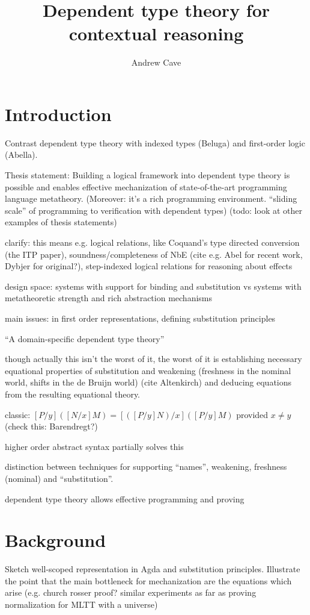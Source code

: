 \documentclass{article}
\author{Andrew Cave}
\title{Dependent type theory for contextual reasoning}
\begin{document}
\maketitle

\section{Introduction}
Contrast dependent type theory with indexed types (Beluga) and first-order
logic (Abella). 

Thesis statement: Building a logical framework into dependent type
theory is possible and enables effective mechanization of state-of-the-art programming
language metatheory. (Moreover: it's a rich programming
environment. ``sliding scale'' of programming to verification with dependent types)
(todo: look at other examples of thesis statements)

clarify: this means e.g. logical relations, like Coquand's type
directed conversion (the ITP paper), soundness/completeness of NbE
(cite e.g. Abel for recent work, Dybjer for original?),
step-indexed logical relations for reasoning about effects

design space: systems with support for binding and substitution vs
systems with metatheoretic strength and rich abstraction mechanisms

main issues:
in first order representations, defining substitution principles

``A domain-specific dependent type theory''

though actually this isn't the worst of it, the worst of it is
establishing necessary equational properties of substitution and weakening
(freshness in the nominal world, shifts in the de Bruijn world) (cite
Altenkirch) and deducing equations from the resulting equational
theory.

classic: $[P/y]([N/x]M) = [([P/y]N)/x] ([P/y]M)$ provided $x\neq y$
(check this: Barendregt?)

higher order abstract syntax partially solves this

distinction between techniques for supporting ``names'', weakening, freshness (nominal) and ``substitution''.

dependent type theory allows effective programming and proving
\section{Background}
Sketch well-scoped representation in Agda and substitution
principles. Illustrate the point that the main bottleneck for
mechanization are the equations which arise (e.g. church rosser proof?
similar experiments as far as proving normalization for MLTT with a universe)
\end{document}
